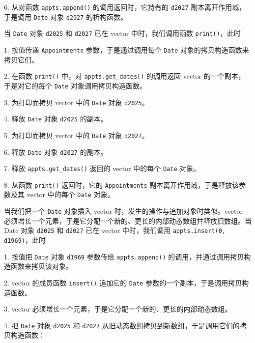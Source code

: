 
6. 从对函数 \texttt{appts.\allowbreak{}append(\allowbreak{})\allowbreak{}} 的调用返回时，它持有的 \texttt{d2027} 副本离开作用域，于是调用 \texttt{Date} 对象 \texttt{d2027} 的析构函数。

当 \texttt{Date} 对象 \texttt{d2025} 和 \texttt{d2027} 已在 vector 中时，我们调用函数 \texttt{print()}，此时

1. 按值传递 \texttt{Appointments} 参数，于是通过调用每个 \texttt{Date} 对象的拷贝构造函数来拷贝它们。

2. 在函数 \texttt{print()} 中，对 \texttt{appts.\allowbreak{}get\_\allowbreak{}dates(\allowbreak{})\allowbreak{}} 的调用返回 vector 的一个副本，于是对它的每个 \texttt{Date} 对象调用拷贝构造函数。

3. 为打印而拷贝 vector 中的 \texttt{Date} 对象 \texttt{d2025}。

4. 释放 \texttt{Date} 对象 \texttt{d2025} 的副本。

5. 为打印而拷贝 vector 中的 \texttt{Date} 对象 \texttt{d2027}。

6. 释放 \texttt{Date} 对象 \texttt{d2027} 的副本。

7. 释放 \texttt{appts.\allowbreak{}get\_\allowbreak{}dates(\allowbreak{})\allowbreak{}} 返回的 vector 中的每个 \texttt{Date} 对象。

8. 从函数 \texttt{print()} 返回时，它的 \texttt{Appointments} 副本离开作用域，于是释放该参数及其 vector 中的每个 \texttt{Date} 对象。

当我们把一个 \texttt{Date} 对象插入 vector 时，发生的操作与追加对象时类似。vector 必须增长一个元素，于是它分配一个新的、更长的内部动态数组并释放旧数组。当 Date 对象 \texttt{d2025} 和 \texttt{d2027} 已在 vector 中时，我们调用 \texttt{appts.\allowbreak{}insert(\allowbreak{}0,\allowbreak{} d1969)\allowbreak{}}，此时

1. 按值把 \texttt{Date} 对象 \texttt{d1969} 参数传给 \texttt{appts.\allowbreak{}append(\allowbreak{})\allowbreak{}} 的调用，并通过调用拷贝构造函数来拷贝该对象。

2. vector 的成员函数 \texttt{insert()} 追加它的 \texttt{Date} 参数的一个副本，于是调用拷贝构造函数。

3. vector 必须增长一个元素，于是它分配一个新的、更长的内部动态数组。

4. 把 \texttt{Date} 对象 \texttt{d2025} 和 \texttt{d2027} 从旧动态数组拷贝到新数组，于是调用它们的拷贝构造函数：


